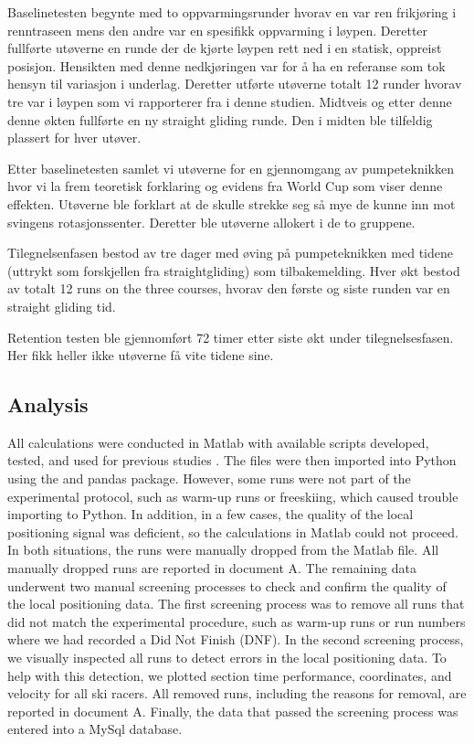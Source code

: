 \documentclass{article}
\begin{document}
Baselinetesten begynte med to oppvarmingsrunder hvorav en var ren frikjøring i renntraseen mens den andre var en spesifikk oppvarming i løypen. Deretter fullførte utøverne en runde der de kjørte løypen rett ned i en statisk, oppreist posisjon. Hensikten med denne nedkjøringen var for å ha en referanse som tok hensyn til variasjon i underlag. Deretter utførte utøverne totalt 12 runder hvorav tre var i løypen som vi rapporterer fra i denne studien. Midtveis og etter denne denne økten fullførte en ny straight gliding runde. Den i midten ble tilfeldig plassert for hver utøver.

Etter baselinetesten samlet vi utøverne for en gjennomgang av pumpeteknikken hvor vi la frem teoretisk forklaring og evidens fra World Cup som viser denne effekten. Utøverne ble forklart at de skulle strekke seg så mye de kunne inn mot svingens rotasjonssenter. Deretter ble utøverne allokert i de to gruppene.

Tilegnelsenfasen bestod av tre dager med øving på pumpeteknikken med tidene (uttrykt som forskjellen fra straightgliding) som tilbakemelding. Hver økt bestod av totalt 12 runs on the three courses, hvorav den første og siste runden var en straight gliding tid. 

Retention testen ble gjennomført 72 timer etter siste økt under tilegnelsesfasen. Her fikk heller ikke utøverne få vite tidene sine. 



\subsection{Analysis}


All calculations were conducted in Matlab with available scripts developed, tested, and used for previous studies \cite{reidKinematicKineticStudy2010}. The files were then imported into Python using the  \cite{2020SciPy-NMeth} and pandas \cite{reback2020pandas} package. However, some runs were not part of the experimental protocol, such as warm-up runs or freeskiing, which caused trouble importing to Python. In addition, in a few cases, the quality of the local positioning signal was deficient, so the calculations in Matlab could not proceed. In both situations, the runs were manually dropped from the Matlab file. All manually dropped runs are reported in document A. The remaining data underwent two manual screening processes to check and confirm the quality of the local positioning data. The first screening process was to remove all runs that did not match the experimental procedure, such as warm-up runs or run numbers where we had recorded a Did Not Finish (DNF). In the second screening process, we visually inspected all runs to detect errors in the local positioning data. To help with this detection, we plotted section time performance, coordinates, and velocity for all ski racers. All removed runs, including the reasons for removal, are reported in document A. Finally, the data that passed the screening process was entered into a MySql database.
\end{document}
